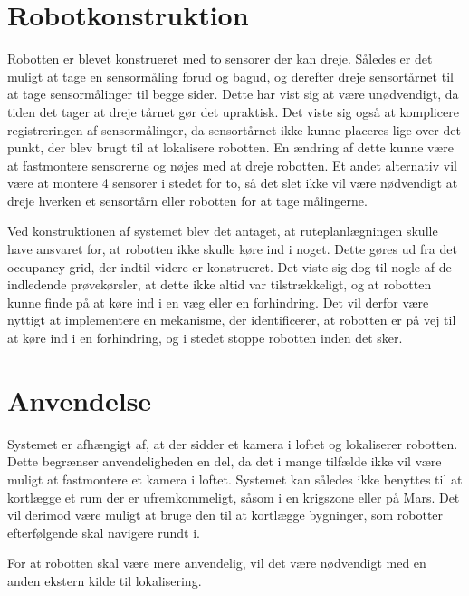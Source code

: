 \section{Robotkonstruktion}
Robotten er blevet konstrueret med to sensorer der kan dreje. 
Således er det muligt at tage en sensormåling forud og bagud, og derefter dreje sensortårnet til at tage sensormålinger til begge sider.
Dette har vist sig at være unødvendigt, da tiden det tager at dreje tårnet gør det upraktisk.
Det viste sig også at komplicere registreringen af sensormålinger, da sensortårnet ikke kunne placeres lige over det punkt, der blev brugt til at lokalisere robotten.
En ændring af dette kunne være at fastmontere sensorerne og nøjes med at dreje robotten.
Et andet alternativ vil være at montere 4 sensorer i stedet for to, så det slet ikke vil være nødvendigt at dreje hverken et sensortårn eller robotten for at tage målingerne.

Ved konstruktionen af systemet blev det antaget, at ruteplanlægningen skulle have ansvaret for, at robotten ikke skulle køre ind i noget. 
Dette gøres ud fra det occupancy grid, der indtil videre er konstrueret.
Det viste sig dog til nogle af de indledende prøvekørsler, at dette ikke altid var tilstrækkeligt, og at robotten kunne finde på at køre ind i en væg eller en forhindring.
Det vil derfor være nyttigt at implementere en mekanisme, der identificerer, at robotten er på vej til at køre ind i en forhindring, og i stedet stoppe robotten inden det sker. 

\section{Anvendelse}
Systemet er afhængigt af, at der sidder et kamera i loftet og lokaliserer robotten.
Dette begrænser anvendeligheden en del, da det i mange tilfælde ikke vil være muligt at fastmontere et kamera i loftet.
Systemet kan således ikke benyttes til at kortlægge et rum der er ufremkommeligt, såsom i en krigszone eller på Mars.
Det vil derimod være muligt at bruge den til at kortlægge bygninger, som robotter efterfølgende skal navigere rundt i.

For at robotten skal være mere anvendelig, vil det være nødvendigt med en anden ekstern kilde til lokalisering.
